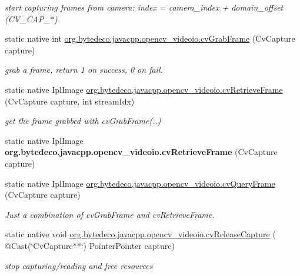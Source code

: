 \begin{DoxyCompactItemize}
\begin{DoxyCompactList}\small\item\em start capturing frames from camera\+: index = camera\+\_\+index + domain\+\_\+offset (C\+V\+\_\+\+C\+A\+P\+\_\+$\ast$) \end{DoxyCompactList}\item 
static native int \hyperlink{group__videoio__c_ga630e4d9ab3ff9f05ab4bc5ba1eb1d787}{org.\+bytedeco.\+javacpp.\+opencv\+\_\+videoio.\+cv\+Grab\+Frame} (Cv\+Capture capture)
\begin{DoxyCompactList}\small\item\em grab a frame, return 1 on success, 0 on fail. \end{DoxyCompactList}\item 
static native Ipl\+Image \hyperlink{group__videoio__c_ga0bb2a83d7a4cd242fae9561742b4af37}{org.\+bytedeco.\+javacpp.\+opencv\+\_\+videoio.\+cv\+Retrieve\+Frame} (Cv\+Capture capture, int stream\+Idx)
\begin{DoxyCompactList}\small\item\em get the frame grabbed with cv\+Grab\+Frame(..) \end{DoxyCompactList}\item 
\mbox{\label{group__videoio__c_gae09f2c1d230bc25233c03b475902c4c0}} 
static native Ipl\+Image {\bfseries org.\+bytedeco.\+javacpp.\+opencv\+\_\+videoio.\+cv\+Retrieve\+Frame} (Cv\+Capture capture)
\item 
static native Ipl\+Image \hyperlink{group__videoio__c_ga5c8fd8eb6b93a72085abecae04eebb12}{org.\+bytedeco.\+javacpp.\+opencv\+\_\+videoio.\+cv\+Query\+Frame} (Cv\+Capture capture)
\begin{DoxyCompactList}\small\item\em Just a combination of cv\+Grab\+Frame and cv\+Retrieve\+Frame. \end{DoxyCompactList}\item 
\mbox{\label{group__videoio__c_ga74708c3e2dd50838b8626b75a7ceaf1d}} 
static native void \hyperlink{group__videoio__c_ga74708c3e2dd50838b8626b75a7ceaf1d}{org.\+bytedeco.\+javacpp.\+opencv\+\_\+videoio.\+cv\+Release\+Capture} ( @Cast(\char`\"{}Cv\+Capture$\ast$$\ast$\char`\"{}) Pointer\+Pointer capture)
\begin{DoxyCompactList}\small\item\em stop capturing/reading and free resources \end{DoxyCompactList}\item 
$$
\end{DoxyCompactItemize}
